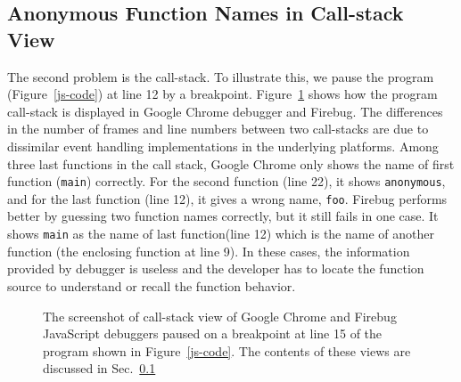\documentclass[10pt, preprint]{sigplanconf}
\begin{document}
\subsection{Anonymous Function Names in Call-stack View}
\label{sec:callstack}
The second problem is the call-stack.
To illustrate this, we pause the program (Figure~\ref{js-code}) at line 12 by a breakpoint. Figure~\ref{debuggers-callstack} shows how the program call-stack is displayed in Google Chrome debugger and Firebug. The differences in the number of frames and line numbers between two call-stacks are due to dissimilar event handling implementations in the underlying platforms. Among three last functions in the call stack, Google Chrome only shows the name of first function (\verb|main|) correctly. For the second function (line 22), it shows \verb|anonymous|, and for the last function (line 12), it gives a wrong name, \verb|foo|. Firebug performs better by guessing two function names correctly, but it still fails in one case. It shows \verb|main| as the name of last function(line 12) which is the name of another function (the enclosing function at line 9). In these cases, the information provided by debugger is useless and the developer has to locate the function source to understand or recall the function behavior. 

\begin{figure}[htp]
\centerline{
\hfil
{}}
\caption{The screenshot of call-stack view of Google Chrome and Firebug JavaScript debuggers paused on a breakpoint at line 15 of the program shown in Figure~\ref{js-code}. The contents of these views are discussed in Sec.~\ref{sec:callstack} }
\label{debuggers-callstack}
\end{figure}
 
\end{document}
